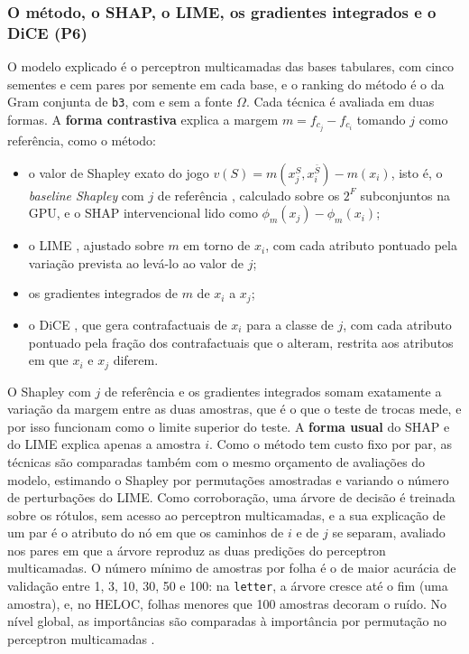\subsubsection*{O método, o SHAP, o LIME, os gradientes integrados e o DiCE (P6)}

O modelo explicado é o perceptron multicamadas das bases tabulares, com cinco sementes e cem pares por semente em cada base, e o ranking do método é o da Gram conjunta de \texttt{b3}, com e sem a fonte $\Omega$. Cada técnica é avaliada em duas formas. A \textbf{forma contrastiva} explica a margem $m = f_{c_j} - f_{c_i}$ tomando $j$ como referência, como o método:
\begin{itemize}
    \item o valor de Shapley exato do jogo $v(S) = m(x_j^{S}, x_i^{\bar S}) - m(x_i)$, isto é, o \textit{baseline Shapley} com $j$ de referência \citep{SundararajanNajmi2020}, calculado sobre os $2^{F}$ subconjuntos na GPU, e o SHAP intervencional \citep{LundbergLee2017} lido como $\phi_m(x_j) - \phi_m(x_i)$;
    \item o LIME \citep{Ribeiro2016}, ajustado sobre $m$ em torno de $x_i$, com cada atributo pontuado pela variação prevista ao levá-lo ao valor de $j$;
    \item os gradientes integrados de $m$ de $x_i$ a $x_j$;
    \item o DiCE \citep{Mothilal2020}, que gera contrafactuais de $x_i$ para a classe de $j$, com cada atributo pontuado pela fração dos contrafactuais que o alteram, restrita aos atributos em que $x_i$ e $x_j$ diferem.
\end{itemize}
O Shapley com $j$ de referência e os gradientes integrados somam exatamente a variação da margem entre as duas amostras, que é o que o teste de trocas mede, e por isso funcionam como o limite superior do teste. A \textbf{forma usual} do SHAP e do LIME explica apenas a amostra $i$. Como o método tem custo fixo por par, as técnicas são comparadas também com o mesmo orçamento de avaliações do modelo, estimando o Shapley por permutações amostradas \citep{Strumbelj2014} e variando o número de perturbações do LIME. Como corroboração, uma árvore de decisão \citep{Breiman1984} é treinada sobre os rótulos, sem acesso ao perceptron multicamadas, e a sua explicação de um par é o atributo do nó em que os caminhos de $i$ e de $j$ se separam, avaliado nos pares em que a árvore reproduz as duas predições do perceptron multicamadas. O número mínimo de amostras por folha é o de maior acurácia de validação entre 1, 3, 10, 30, 50 e 100: na \texttt{letter}, a árvore cresce até o fim (uma amostra), e, no HELOC, folhas menores que 100 amostras decoram o ruído. No nível global, as importâncias são comparadas à importância por permutação no perceptron multicamadas \citep{Breiman2001}.

